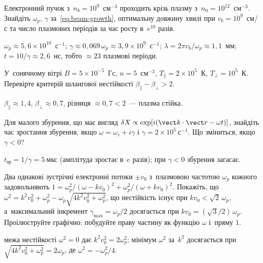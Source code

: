 \begin{problem}\label{prb:BeamGrowth}
Електронний пучок з~$n_b=10^{9}$~см$^{-3}$ проходить крізь плазму з~$n_0=10^{12}$~см$^{-3}$. Знайдіть $\omega_p$,
$\gamma$ за~\eqref{eq:beam-growth}, оптимальну довжину хвилі при $v_b=10^{9}$~см/с та число
плазмових періодів за час росту в~$e^{10}$ разів.
	\begin{solution}
		$\omega_p\approx5{,}6\times10^{10}$~с$^{-1}$; $\gamma\approx0{,}069\,\omega_p\approx3{,}9\times10^{9}$~с$^{-1}$;
$\lambda=2\pi v_b/\omega_p\approx1{,}1$~мм; $t=10/\gamma\approx2{,}6$~нс, тобто $\approx23$ плазмові періоди.
	\end{solution}
\end{problem}

\begin{problem}\label{prb:Firehose}
У~сонячному вітрі $B=5\times10^{-5}$~Гс, $n=5$~см$^{-3}$, $T_\parallel=2\times10^5$~К, $T_\perp=10^5$~К. Перевірте
критерій шлангової нестійкості $\beta_\parallel-\beta_\perp>2$.
	\begin{solution}
		$\beta_\parallel\approx1{,}4$, $\beta_\perp\approx0{,}7$, різниця $\approx0{,}7<2$~--- плазма стійка.
	\end{solution}
\end{problem}

\begin{problem}\label{prb:PlasmaInstabilityGrowth}
Для малого збурення, що має вигляд
$\delta X\propto\exp[i(\vect k\cdot\vect r-\omega t)]$,
знайдіть час зростання збурення, якщо
$\omega=\omega_r+i\gamma$ і
$\gamma=2\times10^5~\mathrm{с}^{-1}$.
Що зміниться, якщо $\gamma<0$?
	\begin{solution}
		$t_{\text{зр}}=1/\gamma=5~\text{мкс}$ (амплітуда зростає в~$e$ разів); при $\gamma<0$ збурення загасає.
	\end{solution}
\end{problem}

\begin{problem}\label{prb:SymmetricTwoStream}
Два однакові зустрічні електронні потоки $\pm v_0$ з~плазмовою частотою $\omega_p$ кожного задовольняють
$1=\omega_p^2/(\omega-kv_0)^2+\omega_p^2/(\omega+kv_0)^2$. Покажіть, що
$\omega^2=k^2v_0^2+\omega_p^2-\omega_p\sqrt{4k^2v_0^2+\omega_p^2}$, що нестійкість існує при
$kv_0<\sqrt2\,\omega_p$, а~максимальний інкремент $\gamma_{\max}=\omega_p/2$ досягається при
$kv_0=(\sqrt3/2)\,\omega_p$. Проілюструйте графічно: побудуйте праву частину як функцію $\omega$ і~пряму $1$.
	\begin{solution}
		межа нестійкості $\omega^2=0$ дає $k^2v_0^2=2\omega_p^2$; мінімум $\omega^2$ за~$k^2$ досягається при
$\sqrt{4k^2v_0^2+\omega_p^2}=2\omega_p$, де $\omega^2=-\omega_p^2/4$.
	\end{solution}
\end{problem}

